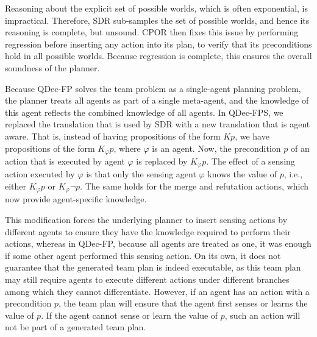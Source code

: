 \documentclass[letterpaper]{article} %
\theoremstyle{definition}
\begin{document}
{Reasoning about the explicit set of possible worlds, which is often exponential, is impractical. Therefore, SDR sub-samples the set of possible worlds, and hence its reasoning is complete, but unsound. CPOR then fixes
this issue by performing regression before inserting any action into its plan, to verify that its preconditions hold in all possible worlds. Because regression is complete, this ensures the overall soundness of the planner.


Because QDec-FP solves the team problem as a single-agent planning problem, the planner treats all agents as part of a single meta-agent, and the knowledge of this agent reflects the combined knowledge of all agents.
In QDec-FPS, we replaced the translation that is used by SDR with a new translation that is agent aware. That is, instead of having propositions of the form $Kp$, we have propositions of the form $K_{\varphi}p$, where $\varphi$ is an agent. Now, the precondition $p$ of an action that is executed by agent $\varphi$ is replaced by $K_{\varphi}p$. The effect of a sensing action executed by $\varphi$ is that only the sensing agent $\varphi$ knows the value of $p$, i.e., either $K_{\varphi}p$ or $K_{\varphi}\neg p$.
The same holds for the merge and refutation actions, which now provide  agent-specific knowledge.

This modification forces the underlying planner to insert sensing actions by different agents to ensure they have the knowledge required to perform their actions, whereas in QDec-FP, because all agents are treated as one, it was enough if some other agent performed this sensing action.
On its own, it does not guarantee that the generated team plan is indeed executable, as this team plan may still require agents to execute different actions under different branches among which they cannot differentiate.
However, if an agent has an action with a precondition $p$, the team plan will ensure that the agent first senses or learns the value of $p$.
If the agent cannot sense or learn the value of $p$, such an action will not be part of a generated team plan.

}
\end{document}
